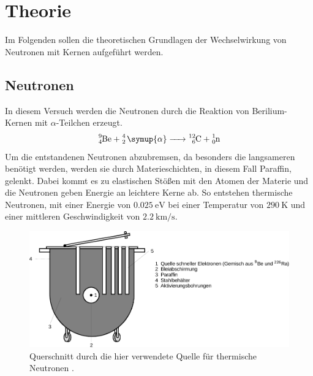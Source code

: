 \section{Theorie} \label{sec:theorie}

    Im Folgenden sollen die theoretischen Grundlagen der Wechselwirkung von Neutronen mit Kernen aufgeführt werden.

\subsection{Neutronen}

    In diesem Versuch werden die Neutronen durch die Reaktion von Berilium-Kernen mit $\alpha$-Teilchen erzeugt.
    \begin{equation*}
        \ce{^{9}_{4}Be + ^{4}_{2} \symup{\alpha} -> ^{12}_{6}C + ^{1}_{0}n}
    \end{equation*}
    Um die entstandenen Neutronen abzubremsen, da besonders die langsameren benötigt werden,
    werden sie durch Materieschichten, in diesem Fall Paraffin, gelenkt.
    Dabei kommt es zu elastischen Stößen mit den Atomen der Materie und die Neutronen geben Energie an leichtere Kerne ab.
    So entstehen thermische Neutronen,
    mit einer Energie von $\SI{0,025}{\electronvolt}$ bei einer Temperatur von $\SI{290}{\kelvin}$
    und einer mittleren Geschwindigkeit von $\SI{2,2}{\kilo\meter\per\second}$.

    \begin{figure}[H]
      \centering
      \includegraphics[width=\textwidth]{content/img/Abb_1.pdf}
      \caption{Querschnitt durch die hier verwendete Quelle für thermische Neutronen \cite{versuchsanleitung}.}
      \label{fig:neutronenquelle}
    \end{figure}


